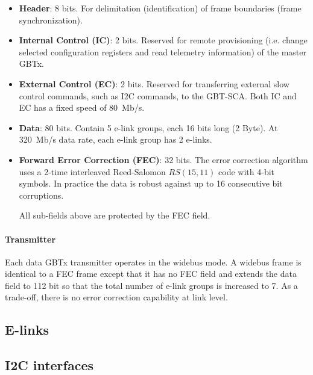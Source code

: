 \begin{itemize}
    \item \textbf{Header}:
        8 bits.
        For delimitation (identification) of frame boundaries
        (frame synchronization).

    \item \textbf{Internal Control (IC)}:
        2 bits.
        Reserved for remote provisioning
        (i.e. change selected configuration registers and read telemetry
        information) of the master GBTx.

    \item \textbf{External Control (EC)}:
        2 bits.
        Reserved for transferring external slow control commands,
        such as I2C commands, to the GBT-SCA.
        Both IC and EC has a fixed speed of 80~Mb/s.

    \item \textbf{Data}:
        80 bits.
        Contain 5 e-link groups, each 16 bits long (2 Byte).
        At 320~Mb/s data rate, each e-link group has 2 e-links.

    \item \textbf{Forward Error Correction (FEC)}:
        32 bits.
        The error correction algorithm uses a 2-time interleaved Reed-Salomon
        $RS(15, 11)$ code with 4-bit symbols.
        In practice the data is robust against up to 16 consecutive bit
        corruptions.

        All sub-fields above are protected by the FEC field.
\end{itemize}

\paragraph{Transmitter}
Each data GBTx transmitter operates in the widebus mode.
A widebus frame is identical to a FEC frame except that it has no FEC field and
extends the data field to 112 bit so that the total number of e-link groups is
increased to 7.
As a trade-off, there is no error correction capability at link level.


\subsection{E-links}
\label{dcb-elink}


\subsection{I2C interfaces}
\label{dcb-i2c}



